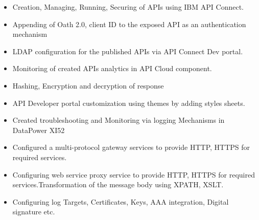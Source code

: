 \documentclass[10pt,a4paper,ragged2e]{altacv}
\begin{document}
\divider

\begin{itemize}

\item Creation, Managing, Running, Securing of APIs using IBM API Connect.
\item Appending of Oath 2.0, client ID to the exposed API as an authentication mechanism
\item LDAP configuration for the published APIs via API Connect Dev portal.
\item Monitoring of created APIs analytics in API Cloud component.
\item  Hashing, Encryption and decryption of response
\item  API Developer portal customization using themes by adding styles sheets.


\item  Created troubleshooting and Monitoring via logging Mechanisms in DataPower XI52
\item  Configured a multi-protocol gateway services to provide HTTP, HTTPS for required services.
\item  Configuring web service proxy service to provide HTTP, HTTPS for required services.Transformation of the message body using XPATH, XSLT.
\item  Configuring log Targets, Certificates, Keys, AAA integration, Digital signature etc.
\end{itemize}


\divider

\end{document}
